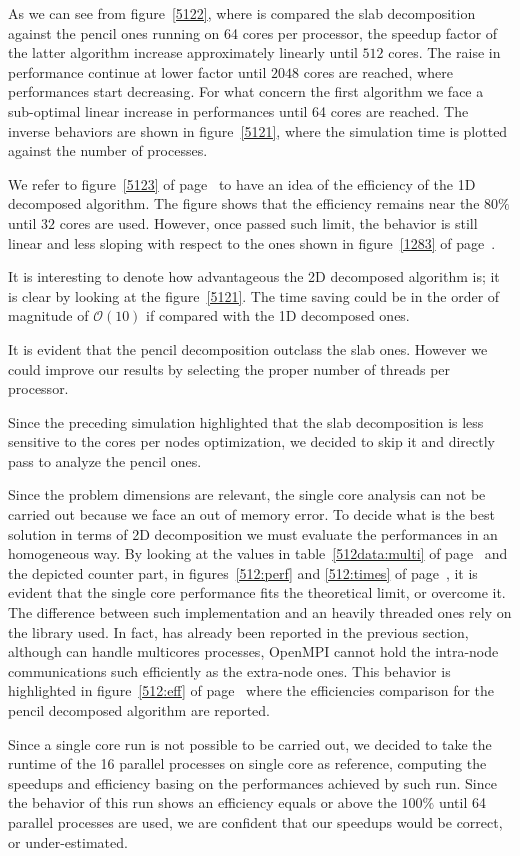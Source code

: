 As we can see from figure~\ref{5122}, where is compared the slab decomposition against the pencil ones running on 64 cores per processor, the speedup factor of the latter algorithm increase approximately linearly until $512$ cores. The raise in performance continue at lower factor until $2048$ cores are reached, where performances start decreasing. For what concern the first algorithm we face a sub-optimal linear increase in performances until 64 cores are reached. 
The inverse behaviors are shown in figure~\ref{5121}, where the simulation time is plotted against the number of processes.
\par
We refer to figure~\ref{5123} of page~\pageref{5123} to have an idea of the efficiency of the 1D decomposed algorithm. The figure shows that the efficiency remains near the $80\%$ until $32$ cores are used. However, once passed such limit, the behavior is still linear and less sloping with  respect to the ones shown in figure~\ref{1283} of page~\pageref{1283}.  \\
\par
It is interesting to denote how advantageous the 2D decomposed algorithm is; it is clear by looking at the figure~\ref{5121}. The time saving could be in the order of magnitude of $\mathcal{O}(10)$ if compared with the 1D decomposed ones.\\
\par
It is evident that the pencil decomposition outclass the slab ones. However we could improve our results by selecting the proper number of threads per processor. 
\par
Since the preceding simulation highlighted that the slab decomposition is less sensitive to the cores per nodes optimization, we decided to skip it and directly pass to analyze the pencil ones. \par
Since the problem dimensions are relevant, the single core analysis can not be carried out because we face an out of memory error.
To decide what is the best solution in terms of 2D decomposition we must evaluate the performances in an homogeneous way. 
By looking at the values in table~\ref{512data:multi} of page~\pageref{512data:multi} and the depicted counter part, in figures~\ref{512:perf} and \ref{512:times} of page~\pageref{512:perf}, it is evident that the single core performance fits the theoretical limit, or overcome it. The difference between such implementation and an heavily threaded ones rely on the library used. In fact, has already been reported in the previous section, although can handle multicores processes, OpenMPI cannot hold the intra-node communications such efficiently as the extra-node ones. This behavior is highlighted in figure~\ref{512:eff} of page~\pageref{512:eff} where the efficiencies comparison for the pencil decomposed algorithm are reported.
\par
Since a single core run is not possible to be carried out, we decided to take the runtime of the 16 parallel processes on single core as reference, computing the speedups and efficiency basing on the performances achieved by such run. Since the behavior of this run shows an efficiency equals or above the $100\%$ until 64 parallel processes are used, we are confident that our speedups would be correct, or under-estimated.

